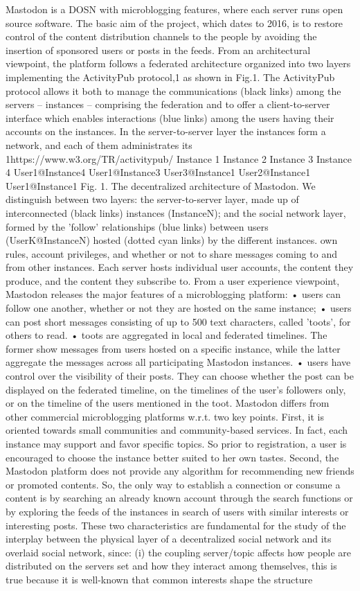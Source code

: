 Mastodon is a DOSN with microblogging features, where each server runs open source software. The basic aim of the project, which dates to 2016, is to restore control of the content distribution channels to the people by avoiding the insertion of sponsored users or posts in the feeds. From an architectural viewpoint, the platform follows a federated architecture organized into two layers implementing the ActivityPub protocol,1 as shown in Fig.1. The ActivityPub protocol allows it both to manage the communications (black links) among the servers – instances – comprising the federation and to offer a client-to-server interface which enables interactions (blue links) among the users having their accounts on the instances. In the server-to-server layer the instances form a network, and each of them administrates its 1https://www.w3.org/TR/activitypub/ Instance 1 Instance 2 Instance 3 Instance 4 User1@Instance4 User1@Instance3 User3@Instance1 User2@Instance1 User1@Instance1 Fig. 1. The decentralized architecture of Mastodon. We distinguish between two layers: the server-to-server layer, made up of interconnected (black links) instances (InstanceN); and the social network layer, formed by the ’follow’ relationships (blue links) between users (UserK@InstanceN) hosted (dotted cyan links) by the different instances. own rules, account privileges, and whether or not to share messages coming to and from other instances. Each server hosts individual user accounts, the content they produce, and the content they subscribe to. From a user experience viewpoint, Mastodon releases the major features of a microblogging platform: • users can follow one another, whether or not they are hosted on the same instance; • users can post short messages consisting of up to 500 text characters, called ’toots’, for others to read. • toots are aggregated in local and federated timelines. The former show messages from users hosted on a specific instance, while the latter aggregate the messages across all participating Mastodon instances. • users have control over the visibility of their posts. They can choose whether the post can be displayed on the federated timeline, on the timelines of the user’s followers only, or on the timeline of the users mentioned in the toot. Mastodon differs from other commercial microblogging platforms w.r.t. two key points. First, it is oriented towards small communities and community-based services. In fact, each instance may support and favor specific topics. So prior to registration, a user is encouraged to choose the instance better suited to her own tastes. Second, the Mastodon platform does not provide any algorithm for recommending new friends or promoted contents. So, the only way to establish a connection or consume a content is by searching an already known account through the search functions or by exploring the feeds of the instances in search of users with similar interests or interesting posts. These two characteristics are fundamental for the study of the interplay between the physical layer of a decentralized social network and its overlaid social network, since: (i) the coupling server/topic affects how people are distributed on the servers set and how they interact among themselves, this is true because it is well-known that common interests shape the structure 